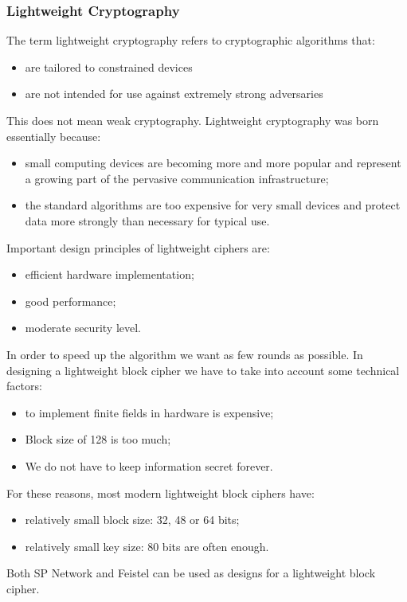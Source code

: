 \documentclass[a4paper, 10pt, titlepage]{article}
\begin{document}
\subsubsection*{Lightweight Cryptography}
The term lightweight cryptography refers to cryptographic algorithms that:
\begin{itemize}
\item are tailored to constrained devices
\item are not intended for use against extremely strong adversaries
\end{itemize}
This does not mean weak cryptography.
Lightweight cryptography was born essentially because:
\begin{itemize}
\item small computing devices are becoming more and more popular and represent a growing part of the pervasive communication infrastructure;
\item the standard algorithms are too expensive for very small devices and protect data more strongly than necessary for typical use.
\end{itemize}
Important design principles of lightweight ciphers are:
\begin{itemize}
\item efficient hardware implementation;
\item good performance;
\item moderate security level.
\end{itemize}
In order to speed up the algorithm we want as few rounds as possible.
In designing a lightweight block cipher we have to take into account some technical factors:
\begin{itemize}
\item to implement finite fields in hardware is expensive;
\item Block size of 128 is too much;
\item We do not have to keep information secret forever.
\end{itemize}
For these reasons, most modern lightweight block ciphers have:
\begin{itemize}
\item relatively small block size: 32, 48 or 64 bits;
\item relatively small key size: 80 bits are often enough.
\end{itemize}
Both SP Network and Feistel can be used as designs for a lightweight
block cipher.
\end{document}
